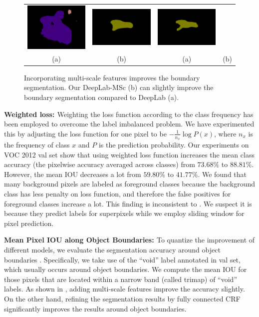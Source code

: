 \begin{figure}[ht]
\begin{tabular}{c c | c c}
      \includegraphics[height=0.12\linewidth]{fig/boundary_refine/vgg128ms_2007_001239.png} &
      \includegraphics[height=0.12\linewidth]{fig/boundary_refine/vgg128noup_2007_001289.png} &
      \includegraphics[height=0.12\linewidth]{fig/boundary_refine/vgg128ms_2007_001289.png} \\
      (a) & (b) & (a) & (b) \\ 
  \end{tabular}
  \caption{Incorporating multi-scale features improves the boundary segmentation. Our DeepLab-MSc (b) can slightly improve the boundary segmentation compared to DeepLab (a).}
  \label{fig:msBoundary}
\end{figure}


{\bf{Weighted loss: }} Weighting the loss function according to the class frequency has been employed to overcome the label imbalanced problem. We have experimented this by adjusting the loss function for one pixel to be $-\frac{1}{n_{x}} \log P(x)$, where $n_x$ is the frequency of class $x$ and $P$ is the prediction probability. Our experiments on VOC 2012 val set show that using weighted loss function increases the mean class accuracy (the pixelwise accuracy averaged across classes) from $73.68\%$ to $88.81\%$. However, the mean IOU decreases a lot from $59.80\%$ to $41.77\%$. We found that many background pixels are labeled as foreground classes because the background class has less penalty on loss function, and therefore the false positives for foreground classes increase a lot. This finding is inconsistent to \citet{mostajabi2014feedforward}. We suspect it is because they predict labels for superpixels while we employ sliding window for pixel prediction.

{\bf{Mean Pixel IOU along Object Boundaries: }}
To quantize the improvement of different models, we evaluate the segmentation accuracy around object boundaries \citep{kohli2009robust, krahenbuhl2011efficient}. Specifically, we take use of the ``void'' label annotated in val set, which usually occurs around object boundaries. We compute the mean IOU for those pixels that are located within a narrow band (called trimap) of ``void'' labels. As shown in , adding multi-scale features improve the accuracy slightly. On the other hand, refining the segmentation results by fully connected CRF significantly improves the results around object boundaries. 

